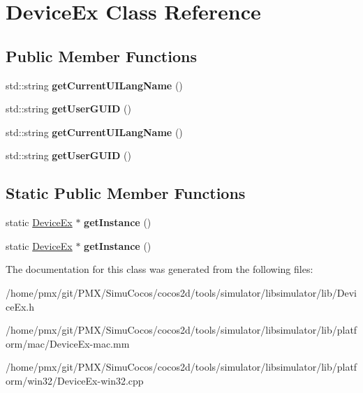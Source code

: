 \hypertarget{classDeviceEx}{}\section{Device\+Ex Class Reference}
\label{classDeviceEx}
\subsection*{Public Member Functions}
\begin{DoxyCompactItemize}
\item 
\mbox{\label{classDeviceEx_a89e1270b9580b81a7933b1a07d27694a}} 
std\+::string {\bfseries get\+Current\+U\+I\+Lang\+Name} ()
\item 
\mbox{\label{classDeviceEx_aecf250f069f383b85e218cc8bab47d45}} 
std\+::string {\bfseries get\+User\+G\+U\+ID} ()
\item 
\mbox{\label{classDeviceEx_a89e1270b9580b81a7933b1a07d27694a}} 
std\+::string {\bfseries get\+Current\+U\+I\+Lang\+Name} ()
\item 
\mbox{\label{classDeviceEx_aecf250f069f383b85e218cc8bab47d45}} 
std\+::string {\bfseries get\+User\+G\+U\+ID} ()
\end{DoxyCompactItemize}
\subsection*{Static Public Member Functions}
\begin{DoxyCompactItemize}
\item 
\mbox{\label{classDeviceEx_a14661acea0374f89d897b89310d8eef2}} 
static \hyperlink{classDeviceEx}{Device\+Ex} $\ast$ {\bfseries get\+Instance} ()
\item 
\mbox{\label{classDeviceEx_a4fa4be83a70a92b53c1e7dc858c0f144}} 
static \hyperlink{classDeviceEx}{Device\+Ex} $\ast$ {\bfseries get\+Instance} ()
\end{DoxyCompactItemize}


The documentation for this class was generated from the following files\+:\begin{DoxyCompactItemize}
\item 
/home/pmx/git/\+P\+M\+X/\+Simu\+Cocos/cocos2d/tools/simulator/libsimulator/lib/Device\+Ex.\+h\item 
/home/pmx/git/\+P\+M\+X/\+Simu\+Cocos/cocos2d/tools/simulator/libsimulator/lib/platform/mac/Device\+Ex-\/mac.\+mm\item 
/home/pmx/git/\+P\+M\+X/\+Simu\+Cocos/cocos2d/tools/simulator/libsimulator/lib/platform/win32/Device\+Ex-\/win32.\+cpp\end{DoxyCompactItemize}
